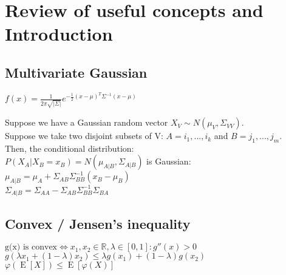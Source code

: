 \section{Review of useful concepts and Introduction}
\subsection{Multivariate Gaussian}
$f(x) = \frac{1}{2\pi \sqrt{|\Sigma|}} e^{- \frac{1}{2} (x-\mu)^T \Sigma^{-1} (x-\mu)}$

Suppose we have a Gaussian random vector $X_V \sim N(\mu_V, \Sigma_{VV})$.\\
Suppose we take two disjoint subsets of V: $A={i_1,...,i_k}$ and $B={j_1,...,j_m}$.\\
Then, the conditional distribution: \\
$P(X_A|X_B=x_B)=N(\mu_{A|B}, \Sigma_{A|B})$ is Gaussian:\\
$\mu_{A|B}=\mu_A+\Sigma_{AB}\Sigma^{-1}_{BB}(x_B-\mu_B)$\\
$\Sigma_{A|B}=\Sigma_{AA}-\Sigma_{AB}\Sigma^{-1}_{BB}\Sigma_{BA}$

\subsection{Convex / Jensen's inequality}
$\text{g(x) is convex} \Leftrightarrow x_1,x_2 \in \mathbb{R}, \lambda \in [0,1]: g''(x) > 0$\\
$g(\lambda x_1 + (1-\lambda) x_2) \leq \lambda g(x_1) + (1-\lambda) g(x_2)$
$\varphi(\operatorname{E}[X]) \leq  \operatorname{E}[\varphi(X)]$